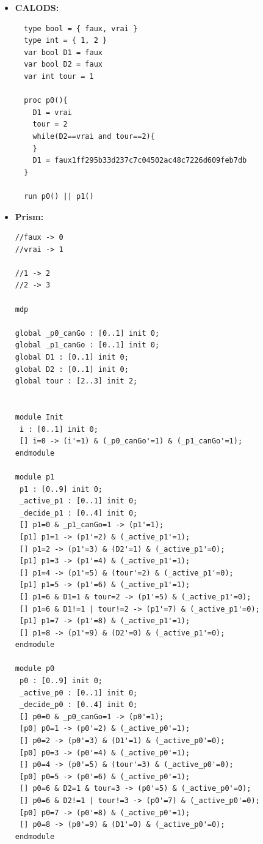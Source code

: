 \documentclass{article}
\begin{document}
\begin{itemize}
  \item{\textbf{CALODS:}
  \begin{lstlisting}
  type bool = { faux, vrai }
  type int = { 1, 2 }
  var bool D1 = faux
  var bool D2 = faux
  var int tour = 1

  proc p0(){
    D1 = vrai
    tour = 2
    while(D2==vrai and tour==2){
    }
    D1 = faux1ff295b33d237c7c04502ac48c7226d609feb7db
  }

  run p0() || p1()
  \end{lstlisting}
  }
  \item{\textbf{Prism:}
  \begin{lstlisting}
//faux -> 0
//vrai -> 1

//1 -> 2
//2 -> 3

mdp

global _p0_canGo : [0..1] init 0;
global _p1_canGo : [0..1] init 0;
global D1 : [0..1] init 0;
global D2 : [0..1] init 0;
global tour : [2..3] init 2;


module Init
 i : [0..1] init 0;
 [] i=0 -> (i'=1) & (_p0_canGo'=1) & (_p1_canGo'=1);
endmodule

module p1
 p1 : [0..9] init 0;
 _active_p1 : [0..1] init 0;
 _decide_p1 : [0..4] init 0;
 [] p1=0 & _p1_canGo=1 -> (p1'=1);
 [p1] p1=1 -> (p1'=2) & (_active_p1'=1);
 [] p1=2 -> (p1'=3) & (D2'=1) & (_active_p1'=0);
 [p1] p1=3 -> (p1'=4) & (_active_p1'=1);
 [] p1=4 -> (p1'=5) & (tour'=2) & (_active_p1'=0);
 [p1] p1=5 -> (p1'=6) & (_active_p1'=1);
 [] p1=6 & D1=1 & tour=2 -> (p1'=5) & (_active_p1'=0);
 [] p1=6 & D1!=1 | tour!=2 -> (p1'=7) & (_active_p1'=0);
 [p1] p1=7 -> (p1'=8) & (_active_p1'=1);
 [] p1=8 -> (p1'=9) & (D2'=0) & (_active_p1'=0);
endmodule

module p0
 p0 : [0..9] init 0;
 _active_p0 : [0..1] init 0;
 _decide_p0 : [0..4] init 0;
 [] p0=0 & _p0_canGo=1 -> (p0'=1);
 [p0] p0=1 -> (p0'=2) & (_active_p0'=1);
 [] p0=2 -> (p0'=3) & (D1'=1) & (_active_p0'=0);
 [p0] p0=3 -> (p0'=4) & (_active_p0'=1);
 [] p0=4 -> (p0'=5) & (tour'=3) & (_active_p0'=0);
 [p0] p0=5 -> (p0'=6) & (_active_p0'=1);
 [] p0=6 & D2=1 & tour=3 -> (p0'=5) & (_active_p0'=0);
 [] p0=6 & D2!=1 | tour!=3 -> (p0'=7) & (_active_p0'=0);
 [p0] p0=7 -> (p0'=8) & (_active_p0'=1);
 [] p0=8 -> (p0'=9) & (D1'=0) & (_active_p0'=0);
endmodule
  \end{lstlisting}
  }
\end{itemize}
\end{document}
